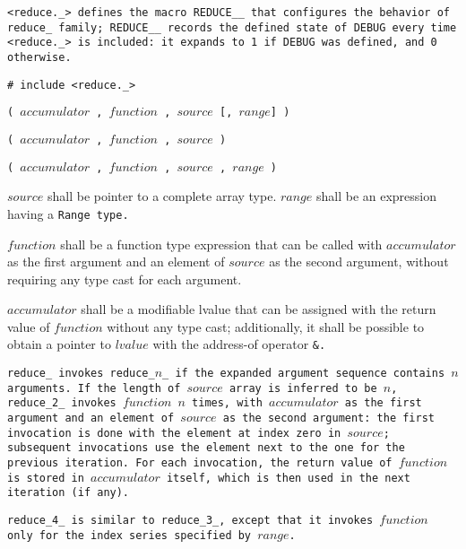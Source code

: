 \tt{<reduce._>} defines the macro  \tt{REDUCE__} that configures the
behavior of \tt{reduce_} family; \tt{REDUCE__} records the \tt{defined}
state of \tt{DEBUG} every time \tt{<reduce._>} is included:
it expands to \tt{1} if \tt{DEBUG} was defined, and \tt{0} otherwise.


\tt{# include <reduce._>}

\s\s\s\tt{(} $accumulator$ \tt{,}
$function$ \tt{,} $source$ [\tt{,} $range$] \tt{)}

\s\tt{(} $accumulator$ \tt{,}
$function$ \tt{,} $source$ \tt{)}

\s\tt{(} $accumulator$ \tt{,}
$function$ \tt{,} $source$ \phantom{[}\tt{,} $range$\phantom{]} \tt{)}


$source$ shall be pointer to a complete array type.
$range$  shall be an expression having a \tt{Range} type.

$function$ shall be a function type expression that can be called with
$accumulator$ as the first argument and an element of $source$ as the
second argument, without requiring any type cast for each argument.

$accumulator$ shall be a modifiable lvalue that can be assigned with the
return value of $function$ without any type cast; additionally, it shall be
possible to obtain a pointer to $lvalue$ with the address-of operator \tt{&}.


\tt{reduce_} invokes \tt{reduce_}$n$\_ if the
expanded argument sequence contains $n$ arguments.
If the length of $source$ array is inferred to be $n$, \tt{reduce_2_}
invokes $function$ $n$ times, with $accumulator$ as the first argument
and an element of $source$ as the second argument: the first invocation
is done with the element at index zero in $source$; subsequent
invocations use the element next to the one for the previous iteration.
For each invocation, the return value of $function$ is stored in
$accumulator$ itself, which is then used in the next iteration (if any).

\tt{reduce_4_} is similar to \tt{reduce_3_}, except that it invokes
$function$ only for the index series specified by $range$.
